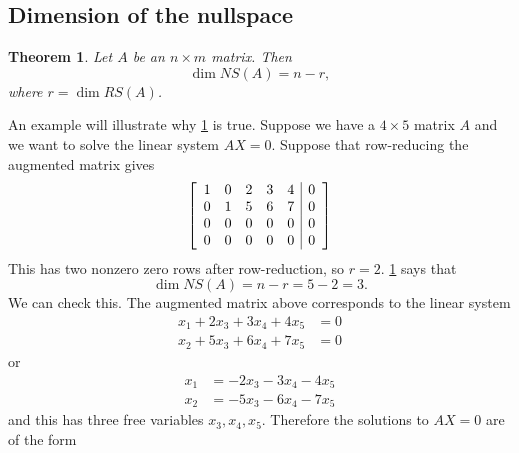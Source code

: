 \documentclass[10pt]{article}
\newenvironment{augmentedmatrix}[1] %
{\left[\begin{array}{#1}}
    {\end{array}\right]}
\newtheorem{theorem}{Theorem}
\theoremstyle{definition}
\begin{document}
\subsection{Dimension of the nullspace}
\begin{theorem}
  \label{thm:dim-of-nullspace-is-n-r}
  Let $A$ be an $n\times m$ matrix. Then
  \begin{equation*}
    \dim NS(A) = n-r,
  \end{equation*}
  where $r=\dim RS(A)$.
\end{theorem}
An example will illustrate why \cref{thm:dim-of-nullspace-is-n-r} is true.
Suppose we have a $4\times 5$ matrix $A$ and we want to solve the linear
system $AX=0$. Suppose that row-reducing the augmented matrix gives
\begin{equation*}
  \begin{augmentedmatrix}{ccccc|c}
    1&0&2&3&4&0\\
    0&1&5&6&7&0\\
    0&0&0&0&0&0\\
    0&0&0&0&0&0\\
  \end{augmentedmatrix}
\end{equation*}
This has two nonzero zero rows after row-reduction, so $r=2$.
\cref{thm:dim-of-nullspace-is-n-r} says that
\begin{equation*}
  \dim NS(A)=n-r=5-2=3.
\end{equation*}
We can check this. The augmented matrix above corresponds to the linear system
\begin{align*}
  x_{1}+2x_{3}+3x_{4}+4x_{5}&=0\\
  x_{2}+5x_{3}+6x_{4}+7x_{5}&=0
\end{align*}
or
\begin{align*}
  x_{1}&=-2x_{3}-3x_{4}-4x_{5}\\
  x_{2}&=-5x_{3}-6x_{4}-7x_{5}
\end{align*}
and this has three free variables $x_{3},x_{4},x_{5}$. Therefore the solutions
to $AX=0$ are of the form
\end{document}
